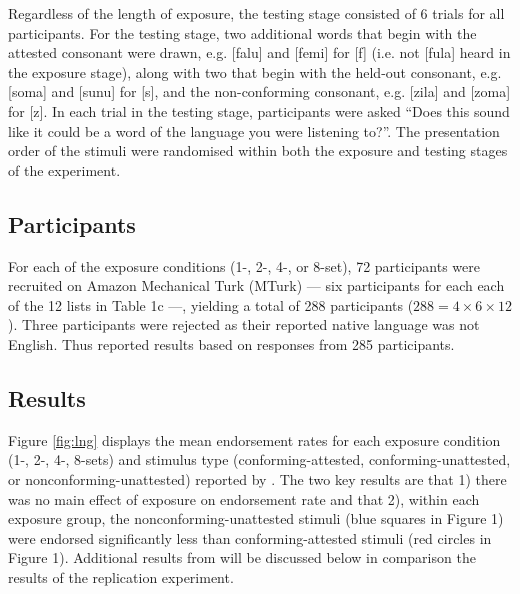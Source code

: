 \documentclass[letterpaper,11pt]{article}
\begin{document}
Regardless of the length of exposure, the testing stage consisted of 6 trials for all participants.
For the testing stage, two additional words that begin with the attested consonant were drawn, e.g. [falu] and [femi] for [f] (i.e. not [fula] heard in the exposure stage), along with two that begin with the held-out consonant, e.g. [soma] and [sunu] for [s], and the non-conforming consonant, e.g. [zila] and [zoma] for [z].
In each trial in the testing stage, participants were asked ``Does this sound like it could be a word of the language you were listening to?''.
The presentation order of the stimuli were randomised within both the exposure and testing stages of the experiment.

\subsection{Participants}

For each of the exposure conditions (1-, 2-, 4-, or 8-set), 72 participants were recruited on Amazon Mechanical Turk (MTurk) --- six participants for each each of the 12 lists in Table 1c ---, yielding a total of 288 participants ($288 = 4 \times 6 \times 12$).
Three participants were rejected as their reported native language was not English. Thus \textcite{linzen2017rapid} reported results based on responses from 285 participants.

\subsection{Results}

Figure \ref{fig:lng} displays the mean endorsement rates for each exposure condition (1-, 2-, 4-, 8-sets) and stimulus type (conforming-attested, conforming-unattested, or nonconforming-unattested) reported by \textcite{linzen2017rapid}.
The two key results are that 1) there was no main effect of exposure on endorsement rate and that 2), within each exposure group, the nonconforming-unattested stimuli (blue squares in Figure 1) were endorsed significantly less than conforming-attested stimuli (red circles in Figure 1).
Additional results from \textcite{linzen2017rapid} will be discussed below in comparison the results of the replication experiment.
\end{document}
